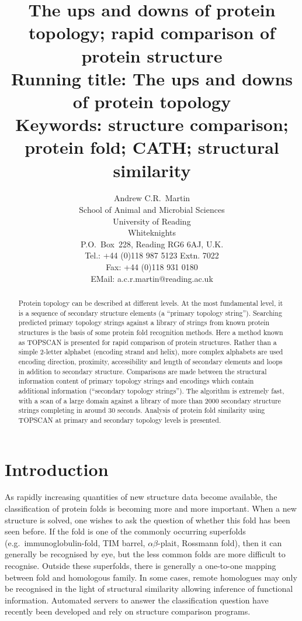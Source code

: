 \documentclass{article}
\title{The ups and downs of protein topology; rapid comparison of protein
structure\\
{\large {\bfseries Running title:} The ups and downs of protein topology}\\
{\large {\bfseries Keywords:} structure comparison; protein fold;
CATH; structural similarity}}
\author{Andrew C.R.\ Martin\\
School of Animal and Microbial Sciences\\
University of Reading\\
Whiteknights\\
P.O.~Box~228, Reading RG6 6AJ, U.K.\\
Tel.: +44 (0)118 987 5123 Extn. 7022\\
Fax: +44 (0)118 931 0180 \\
EMail: a.c.r.martin@reading.ac.uk}
\begin{document}
\maketitle


\begin{abstract}
Protein topology can be described at different levels. At the most
fundamental level, it is a sequence of secondary structure elements (a
``primary topology string''). Searching predicted primary topology
strings against a library of strings from known protein structures is
the basis of some protein fold recognition methods.  Here a method
known as TOPSCAN is presented for rapid comparison of protein
structures. Rather than a simple 2-letter alphabet (encoding strand
and helix), more complex alphabets are used encoding direction,
proximity, accessibility and length of secondary elements and loops in
addition to secondary structure.  Comparisons are made between the
structural information content of primary topology strings and
encodings which contain additional information (``secondary topology
strings'').  The algorithm is extremely fast, with a scan of a large
domain against a library of more than 2000 secondary structure strings
completing in around 30 seconds. Analysis of protein fold similarity
using TOPSCAN at primary and secondary topology levels is presented.
\end{abstract}

\section{Introduction}
As rapidly increasing quantities of new structure data become
available, the classification of protein folds is becoming more and
more important. When a new structure is solved, one wishes to ask the
question of whether this fold has been seen before. If the fold is one
of the commonly occurring superfolds (e.g.\ immunoglobulin-fold, TIM
barrel, $\alpha\beta$-plait, Rossmann fold), then it can generally be
recognised by eye, but the less common folds are more difficult to
recognise. Outside these superfolds, there is generally a one-to-one
mapping between fold and homologous family.  In some cases, remote
homologues may only be recognised in the light of structural
similarity allowing inference of functional information.  Automated
servers to answer the classification question have recently been
developed and rely on structure comparison programs.
\end{document}
